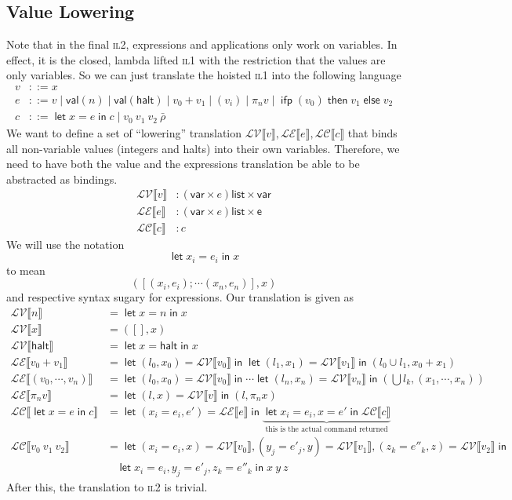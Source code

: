 \documentclass[11pt,a4paper]{article}
\newcommand {\coo} [1] {\ensuremath{\operatorname{\mathsf{#1}}}}
\newcommand {\co} [1] {\coo{#1}}
\newcommand {\Ifp}[3] {\co{ifp} (#1) \co{then} #2 \co{else} #3}
\newcommand{\Let}[1]{\coo{let} #1 \coo{in} }
\newcommand{\f}[1]{\textsc{#1}}
\newcommand{\g}[1]{\textsf{#1}}
\newcommand{\trans}[2]{\ensuremath{\mathcal{#1}\llbracket #2\rrbracket}}
\begin{document}
\begin{enumerate}[label=\textbf{Excercise \arabic*\ }]
\begin{enumerate}
\section*{Value Lowering}
Note that in the final \f{il2}, expressions and applications only work on variables. In effect, it is the closed, lambda lifted \f{il1} with the restriction that the values are only variables. So we can just translate the hoisted \f{il1} into the following language
\begin{align*}
v &::= x \\
e &::= v \mid \g{val}(n) \mid \g{val}(\g{halt}) \mid v_0 + v_1 \mid (v_i) \mid \pi_n v \mid \Ifp{v_0}{v_1}{v_2} \\
c &::= \Let{x = e}{c} \mid v_0~v_1~v_2~\bar\rho
\end{align*}
We want to define a set of ``lowering'' translation $\trans{LV}{v}, \trans{LE}{e}, \trans{LC}{c}$ that binds all non-variable values (integers and halts) into their own variables. Therefore, we need to have both the value and the expressions translation be able to be abstracted as bindings.
\begin{align*}
\trans{LV}{v} &: (\g{var} \times e) \g{list} \times \g{var} \\
\trans{LE}{e} &: (\g{var} \times e) \g{list} \times \g{e} \\
\trans{LC}{c} &: c
\end{align*}
We will use the notation
$$
\Let{x_i = e_i}{x}
$$
to mean
$$
([(x_i,e_i); \cdots (x_n,e_n)],x)
$$
and respective syntax sugary for expressions. Our translation is given as
\begin{align*}
\trans{LV}{n} &= \Let{x = n}{x} \\
\trans{LV}{x} &= ([], x) \\
\trans{LV}{\g{halt}} &= \Let{x = \g{halt}}{x} \\
\trans{LE}{v_0 + v_1} &= \Let{(l_0, x_0) = \trans{LV}{v_0}}{\Let{(l_1,x_1) = \trans{LV}{v_1}}{(l_0 \cup l_1, x_0 + x_1)}} \\
\trans{LE}{(v_0, \cdots, v_n)} &= \Let{(l_0, x_0) = \trans{LV}{v_0}}{\cdots\Let{(l_n,x_n) = \trans{LV}{v_n}}{(\bigcup l_k, (x_1,\cdots, x_n))}} \\
\trans{LE}{\pi_n v} &= \Let{(l,x) = \trans{LV}{v}}{(l, \pi_n x)} \\
\trans{LC}{\Let{x = e}{c}} &= \Let{(x_i = e_i, e') = \trans{LE}{e}}{\underbrace{\Let{x_i = e_i,x = e'}{\trans{LC}{c}}}_{\mbox{this is the actual command returned}}} \\
\trans{LC}{v_0~v_1~v_2} &= \Let{(x_i = e_i, x) = \trans{LV}{v_0}, (y_j = e'_j, y) = \trans{LV}{v_1}, (z_k = e''_k, z) = \trans{LV}{v_2}}{}\\&~~~~{\Let{x_i = e_i,y_j = e'_j,z_k=e''_k}{x ~ y~z}} 
\end{align*}
After this, the translation to \f{il2} is trivial.
\end{enumerate}
\end{enumerate}
\end{document}
